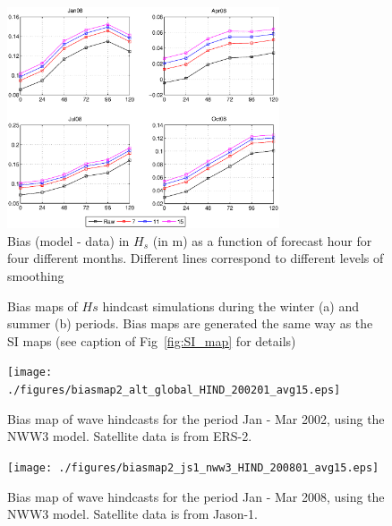 \documentclass[12pt]{article}
\begin{document}
\begin{figure}[t]
\noindent\includegraphics[width=19pc]{./figures/glo_30m_bih_comp.eps}
\caption{Bias (model - data) in $H_s$ (in m) as a function of forecast hour for four different months. Different lines correspond to different levels of smoothing}
\label{fig:bih_global}
\end{figure}

\setcounter{subfigure}{0}
\begin{figure}[t] 
\hspace*{0.25in}
\caption{Bias maps of $Hs$ hindcast simulations during the winter (a) and summer (b) periods. Bias maps are generated the same way as the SI maps (see caption of Fig~\ref{fig:SI_map} for details)}  
\label{fig:bias_map_js1}
\end{figure}

\begin{figure}
\noindent\texttt{[image: ./figures/biasmap2\_alt\_global\_HIND\_200201\_avg15.eps]}
\caption{Bias map of wave hindcasts for the period Jan - Mar 2002, using the NWW3 model. Satellite data is from ERS-2.} 
\label{fig:bias_map_alt}
\end{figure}

\begin{figure}
\noindent\texttt{[image: ./figures/biasmap2\_js1\_nww3\_HIND\_200801\_avg15.eps]}
\caption{Bias map of wave hindcasts for the period Jan - Mar 2008, using the NWW3 model. Satellite data is from Jason-1.} 
\label{fig:bias_map_js1_nww3}
\end{figure}
\end{document}
